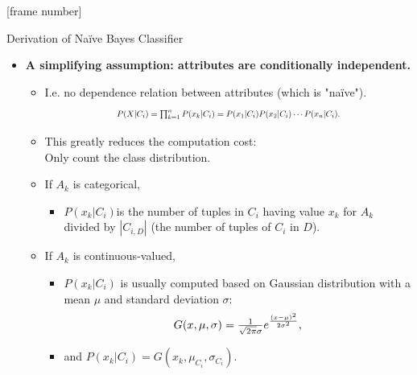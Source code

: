 \documentclass[aspectratio=169,t,table]{beamer}
\begin{document}
  {
    [frame number]
    \begin{frame}{Derivation of Naïve Bayes Classifier}
        \begin{itemize}
          \item \textbf{A simplifying assumption: attributes are {\color{airforceblue}conditionally independent}.}
          \begin{itemize}
            \item I.e. no dependence relation between attributes (which is "naïve").
            \begin{align*}
              \resizebox{7cm}{!}{%
              $P(X|C_i) = \prod_{k=1}^{n} P(x_k|C_i) = P(x_1|C_i)P(x_2|C_i)\cdots P(x_n|C_i).$}
            \end{align*}
            \item This greatly reduces the computation cost:\\
                  Only count the class distribution.
            \item If $A_k$ is categorical,
            \begin{itemize}
              \item $P(x_k|C_i)$is the number of tuples in $C_i$ having value $x_k$ for $A_k$ \\
                    divided by $|C_{i,D}|$ (the number of tuples of $C_i$ in $D$).
            \end{itemize}
            \item If $A_k$ is continuous-valued,
            \begin{itemize}
              \item $P(x_k|C_i)$ is usually computed based on Gaussian distribution with a mean $\mu$ and standard deviation $\sigma$:
              \begin{align*}
                \resizebox{4cm}{!}{%
                $G(x,\mu,\sigma) = \frac{1}{\sqrt{2\pi}\sigma}e^{\frac{(x-\mu)^2}{2\sigma^2}},$}
              \end{align*}
              \item and $P(x_k|C_i) = G(x_k,\mu_{C_i},\sigma_{C_i})$.
            \end{itemize}
          \end{itemize}
        \end{itemize}
    \end{frame}
  }
\end{document}
